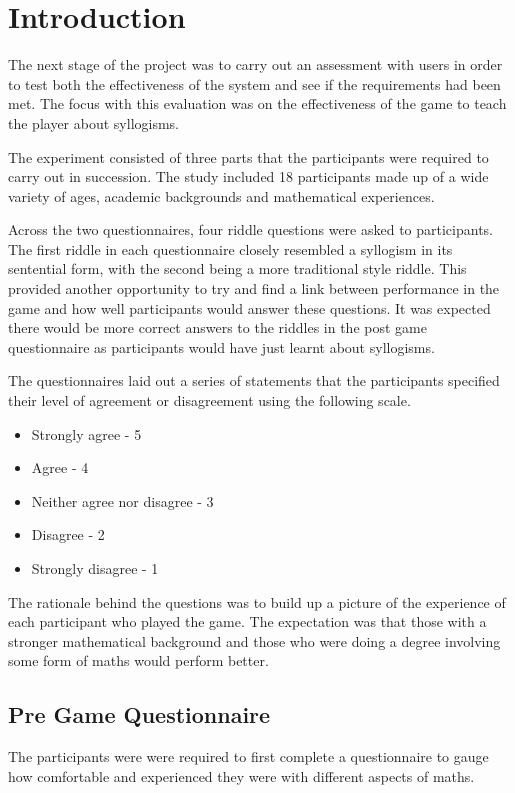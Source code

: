 \documentclass[12pt,a4paper]{report}
\begin{document}
\section{Introduction}
The next stage of the project was to carry out an assessment with users in order to test both the effectiveness of the system and see if the requirements had been met. The focus with this evaluation was on the effectiveness of the game to teach the player about syllogisms.

The experiment consisted of three parts that the participants were required to carry out in succession. The study included 18 participants made up of a wide variety of ages, academic backgrounds and mathematical experiences. 

 Across the two questionnaires, four riddle questions were asked to participants. The first riddle in each questionnaire closely resembled a syllogism in its sentential form, with the second being a more traditional style riddle. This provided another opportunity to try and find a link between performance in the game and how well participants would answer these questions. It was expected there would be more correct answers to the riddles in the post game questionnaire as participants would have just learnt about syllogisms. 


The questionnaires laid out a series of statements that the participants specified their level of agreement or disagreement using the following scale. 

\begin{itemize}
	\item Strongly agree - 5
	\item Agree - 4
	\item Neither agree nor disagree - 3
	\item Disagree - 2
	\item Strongly disagree - 1
\end{itemize}	

The rationale behind the questions was to build up a picture of the experience of each participant who played the game. The expectation was that those with a stronger mathematical background and those who were doing a degree involving some form of maths would perform better. 

\subsection{Pre Game Questionnaire}

The participants were were required to first complete a questionnaire to gauge how comfortable and experienced they were with different aspects of maths.
\end{document}
